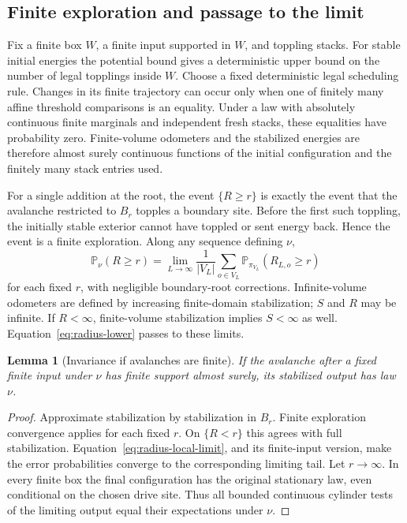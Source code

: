 \documentclass[11pt]{article}
\numberwithin{equation}{section}
\newtheorem{lemma}[theorem]{Lemma}
\theoremstyle{definition}
\newcommand{\Prob}{\mathbb P}
\begin{document}
\subsection{Finite exploration and passage to the limit}\label{sec:continuity}
Fix a finite box $W$, a finite input supported in $W$, and toppling stacks. For stable initial energies the potential bound gives a deterministic upper bound on the number of legal topplings inside $W$. Choose a fixed deterministic legal scheduling rule. Changes in its finite trajectory can occur only when one of finitely many affine threshold comparisons is an equality. Under a law with absolutely continuous finite marginals and independent fresh stacks, these equalities have probability zero. Finite-volume odometers and the stabilized energies are therefore almost surely continuous functions of the initial configuration and the finitely many stack entries used.

For a single addition at the root, the event $\{R\ge r\}$ is exactly the event that the avalanche restricted to $B_r$ topples a boundary site. Before the first such toppling, the initially stable exterior cannot have toppled or sent energy back. Hence the event is a finite exploration. Along any sequence defining $\nu$,
\begin{equation}\label{eq:radius-local-limit}
 \Prob_\nu(R\ge r)
 =\lim_{L\to\infty}\frac1{|V_L|}
 \sum_{o\in V_L}\Prob_{\pi_{V_L}}(R_{L,o}\ge r)
\end{equation}
for each fixed $r$, with negligible boundary-root corrections. Infinite-volume odometers are defined by increasing finite-domain stabilization; $S$ and $R$ may be infinite. If $R<\infty$, finite-volume stabilization implies $S<\infty$ as well. Equation~\eqref{eq:radius-lower} passes to these limits.

\begin{lemma}[Invariance if avalanches are finite]\label{lem:conditional-invariance}
If the avalanche after a fixed finite input under $\nu$ has finite support almost surely, its stabilized output has law $\nu$.
\end{lemma}
\begin{proof}
Approximate stabilization by stabilization in $B_r$. Finite exploration convergence applies for each fixed $r$. On $\{R<r\}$ this agrees with full stabilization. Equation~\eqref{eq:radius-local-limit}, and its finite-input version, make the error probabilities converge to the corresponding limiting tail. Let $r\to\infty$. In every finite box the final configuration has the original stationary law, even conditional on the chosen drive site. Thus all bounded continuous cylinder tests of the limiting output equal their expectations under $\nu$.
\end{proof}
\end{document}
